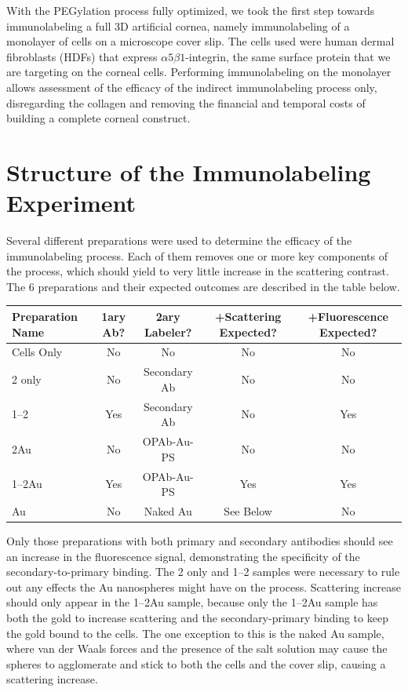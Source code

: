 With the PEGylation process fully optimized, we took the first step towards immunolabeling a full 3D artificial cornea, namely immunolabeling of a monolayer of cells on a microscope cover slip. The cells used were human dermal fibroblasts (HDFs) that express $\alpha5\beta1$-integrin, the same surface protein that we are targeting on the corneal cells. Performing immunolabeling on the monolayer allows assessment of the efficacy of the indirect immunolabeling process only, disregarding the collagen and removing the financial and temporal costs of building a complete corneal construct.

\section{Structure of the Immunolabeling Experiment}
\label{structureoftheimmunolabelingexperiment}

Several different preparations were used to determine the efficacy of the immunolabeling process. Each of them removes one or more key components of the process, which should yield to very little increase in the scattering contrast. The 6 preparations and their expected outcomes are described in the table below.


\begin{table}[htbp]
\begin{minipage}{\linewidth}
\setlength{\tymax}{0.5\linewidth}
\centering
\small
\begin{tabular}{@{}lcccc@{}} \toprule
Preparation Name&1ary Ab?&2ary Labeler?&+Scattering Expected?&+Fluorescence Expected?\\
\midrule
Cells Only&No&No&No&No\\
2 only&No&Secondary Ab&No&No\\
1--2&Yes&Secondary Ab&No&Yes\\
2Au&No&OPAb-Au-PS&No&No\\
1--2Au&Yes&OPAb-Au-PS&Yes&Yes\\
Au&No&Naked Au&See Below&No\\

\bottomrule

\end{tabular}
\end{minipage}
\end{table}


Only those preparations with both primary and secondary antibodies should see an increase in the fluorescence signal, demonstrating the specificity of the secondary-to-primary binding. The 2 only and 1--2 samples were necessary to rule out any effects the Au nanospheres might have on the process. Scattering increase should only appear in the 1--2Au sample, because only the 1--2Au sample has both the gold to increase scattering and the secondary-primary binding to keep the gold bound to the cells. The one exception to this is the naked Au sample, where van der Waals forces and the presence of the salt solution may cause the spheres to agglomerate and stick to both the cells and the cover slip, causing a scattering increase.

